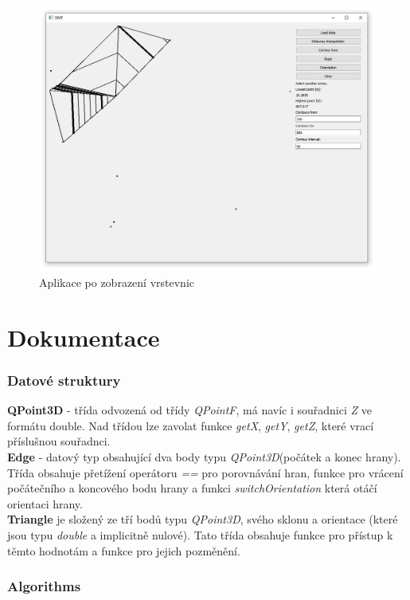 \documentclass{article}
\begin{document}
\begin{figure}[hp]
\centering
        \includegraphics[trim=0cm 0cm 0cm 0cm, width=1\textwidth]{contours.jpg}
        \caption{Aplikace po zobrazení vrstevnic}
\end{figure}

\newpage
\section{Dokumentace}

\subsubsection{Datové struktury}
\textbf{QPoint3D} - třída odvozená od třídy \textit{QPointF}, má navíc i souřadnici \textit{Z} ve formátu double. Nad třídou lze zavolat funkce \textit{getX}, \textit{getY}, \textit{getZ}, které vrací příslušnou souřadnci. \\
\textbf{Edge} - datový typ obsahující dva body typu \textit{QPoint3D}(počátek a konec hrany). Třída obsahuje přetížení operátoru \textit{==} pro porovnávání hran, funkce pro vrácení počátečního a koncového bodu hrany a funkci \textit{switchOrientation} která otáčí orientaci hrany. \\
\textbf{Triangle} je složený ze tří bodů typu \textit{QPoint3D}, svého sklonu a orientace (které jsou typu \textit{double} a implicitně nulové). Tato třída obsahuje funkce pro přístup k těmto hodnotám a funkce pro jejich pozměnění. \\

\subsubsection{Algorithms} 
 
\end{document}
